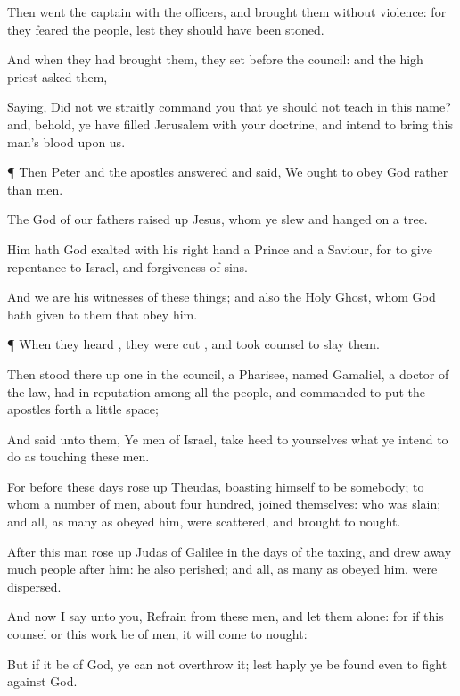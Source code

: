 {Then
went the
captain
with the
officers,
and
brought
them
without
violence:
for they
feared the
people,
lest they should have been
stoned.

And when they had
brought
them, they
set
{}
before the
council:
and the high
priest
asked
them,

Saying, Did
not
we
straitly
command
you that ye
should
not
teach
in
this
name?
and,
behold, ye have
filled
Jerusalem
with
your
doctrine,
and
intend to
bring
this
man’s
blood
upon
us.


\par }{\PP {}¶
Then
Peter
and
the
{}
apostles
answered
and
said,
We
ought to
obey
God
rather
than
men.

The
God
of
our
fathers raised
up
Jesus,
whom
ye
slew and
hanged
on a
tree.

Him
hath
God
exalted
with
his right
hand
{} a
Prince
and a
Saviour, for to
give
repentance to
Israel,
and
forgiveness of
sins.

And
we
are
his
witnesses
of
these
things;
and
{}
also
the
Holy
Ghost,
whom
God hath
given to
them
that
obey
him.


\par }{\PP {}¶
When they
heard
{}, they were
cut
{},
and took
counsel to
slay
them.

Then stood there
up
one
in the
council, a
Pharisee,
named
Gamaliel, a doctor of the
law, had in
reputation
among
all the
people, and
commanded to
put the
apostles
forth a little
space;

And
said
unto
them, Ye
men of
Israel, take
heed to
yourselves
what ye
intend to
do as
touching
these
men.

For
before
these
days rose
up
Theudas,
boasting
himself to
be
somebody; to
whom a
number of
men,
about four
hundred, joined
themselves:
who was
slain;
and
all, as many
as
obeyed
him, were
scattered,
and
brought
to
nought.

After
this man rose
up
Judas of
Galilee
in the
days of the
taxing,
and drew
away
much
people
after
him: he
also
perished;
and
all,
{} as many
as
obeyed
him, were
dispersed.

And
now I
say unto
you,
Refrain
from
these
men,
and
let
them
alone:
for
if
this
counsel
or
this
work
be
of
men, it will come to
nought:

But
if it
be
of
God, ye
can
not
overthrow
it; lest
haply ye be
found
even to fight against
God.

}
